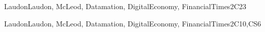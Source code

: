 \begin{syllabus}
\begin{unit}{\SPSecurityPoliciesLawsandComputerCrimes}{}{LaudonLaudon, McLeod, Datamation, DigitalEconomy, FinancialTimes}{2}{C23}
	\begin{learningoutcomes}%
        \item \SPSecurityPoliciesLawsandComputerCrimesLOListClassic [\Familiarity]
        \item \SPSecurityPoliciesLawsandComputerCrimesLOIdentifyLaws [\Familiarity]
        \item \SPSecurityPoliciesLawsandComputerCrimesLODescribeTheRamifications [\Familiarity]
        \item \SPSecurityPoliciesLawsandComputerCrimesLOExamineTheLegal [\Familiarity]
        \item \SPSecurityPoliciesLawsandComputerCrimesLODiscussTheRole [\Familiarity]
        \item \SPSecurityPoliciesLawsandComputerCrimesLOInvestigateMeasures [\Familiarity]
        \item \SPSecurityPoliciesLawsandComputerCrimesLOWriteASecurity [\Familiarity]
	\end{learningoutcomes}
\end{unit}

\begin{unit}{\SPEconomiesofComputing}{}{LaudonLaudon, McLeod, Datamation, DigitalEconomy, FinancialTimes}{2}{C10,CS6}
	\begin{topics}
        \item \SPEconomiesofComputingTopicMonopolies
        \item \SPEconomiesofComputingTopicEffect
        \item \SPEconomiesofComputingTopicPricing
        \item \SPEconomiesofComputingTopicThePhenomenon
        \item \SPEconomiesofComputingTopicConsequences
        \item \SPEconomiesofComputingTopicDifferences
        \item \SPEconomiesofComputingTopicCost
        \item \SPEconomiesofComputingTopicCostEstimates
        \item \SPEconomiesofComputingTopicEntrepreneurship
        \item \SPEconomiesofComputingTopicNetwork
        \item \SPEconomiesofComputingTopicUse
	\end{topics}


\end{unit}
\end{syllabus}
